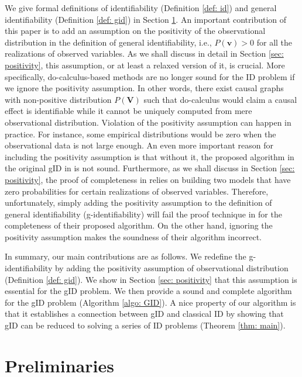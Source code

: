 \documentclass[accepted]{uai2022}
\newcommand{\V}[0]{\mathbf{V}}
\begin{document}
    We give formal definitions of identifiability (Definition \ref{def: id}) and general identifiability (Definition \ref{def: gid}) in Section \ref{sec: pre}.
    An important contribution of this paper is to add an assumption on the positivity of the observational distribution in the definition of general identifiability, i.e., $P(\mathbf{v})>0$ for all the realizations of observed variables.
    As we shall discuss in detail in Section \ref{sec: positivity}, this assumption, or at least a relaxed version of it, is crucial.
    More specifically, do-calculus-based methods are no longer sound for the ID problem if we ignore the positivity assumption. 
    In other words, there exist causal graphs with non-positive distribution $P(\V)$ such that do-calculus would claim a causal effect is identifiable while it cannot be uniquely computed from mere observational distribution.
    Violation of the positivity assumption can happen in practice. For instance, some empirical distributions would be zero when the observational data is not large enough.
    An even more important reason for including the positivity assumption is that without it, the proposed algorithm in the original gID in \citep{lee2019general} is not sound.
    Furthermore, as we shall discuss in Section \ref{sec: positivity}, the proof of completeness in \citep{lee2019general} relies on building two models that have zero probabilities for certain realizations of observed variables.
    Therefore, unfortunately, simply adding the positivity assumption to the definition of general identifiability (g-identifiability) will fail the proof technique in \citep{lee2019general} for the completeness of their proposed algorithm.
    On the other hand, ignoring the positivity assumption makes the soundness of their algorithm incorrect.
    
    In summary, our main contributions are as follows.
    We redefine the g-identifiability by adding the positivity assumption of observational distribution (Definition \ref{def: gid}).  
    We show in Section \ref{sec: positivity} that this assumption is essential for the gID problem.
    We then provide a sound and complete algorithm for the gID problem (Algorithm \ref{algo: GID}). 
    A nice property of our algorithm is that it establishes a connection between gID and classical ID by showing that gID can be reduced to solving a series of ID problems (Theorem \ref{thm: main}).

\section{Preliminaries} \label{sec: pre}
\end{document}
